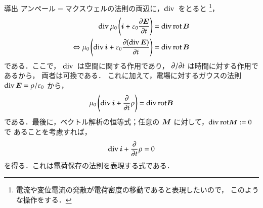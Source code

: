     \begin{mysmallsec}{導出}
        アンペール$=$マクスウェルの法則の両辺に，$\mathrm{div}\,$ をとると
        \footnote{
            電流や変位電流の発散が電荷密度の移動であると表現したいので，
            このような操作をする．
        }，
        \begin{align*}
            \mathrm{div}\,\mu_{0}\left( \boldsymbol{i} + \varepsilon_{0}\frac{\partial \boldsymbol{E}}{\partial t} \right)
            &=\mathrm{div}\,\mathrm{rot}\,\boldsymbol{B} \\
            \Leftrightarrow
                \mu_{0}\left(\mathrm{div}\,\boldsymbol{i}+ \varepsilon_{0}\frac{\partial (\mathrm{div}\,\boldsymbol{E})}{\partial t} \right)
            &=\mathrm{div}\,\mathrm{rot}\,\boldsymbol{B}
        \end{align*}
        である．ここで， $\mathrm{div}\,$ は空間に関する作用であり， $\partial/\partial t$ は時間に対する作用であるから，
        両者は可換である．
        これに加えて，電場に対するガウスの法則 $\mathrm{div}\,\boldsymbol{E}=\rho/\varepsilon_{0}$ から，
        \begin{align*}
                \mu_{0}\left(\mathrm{div}\,\boldsymbol{i}+\frac{\partial }{\partial t}\rho\right)=\mathrm{div\,rot}\boldsymbol{B}
        \end{align*}
        である．最後に，ベクトル解析の恒等式；任意の $\boldsymbol{M}$ に対して，$\mathrm{div\,rot}\boldsymbol{M}:= 0$ で
        あることを考慮すれば，
        \begin{align}
            \mathrm{div}\,\boldsymbol{i}+ \frac{\partial }{\partial t} \rho =0
        \end{align}
        を得る．これは電荷保存の法則を表現する式である．
    \end{mysmallsec}


